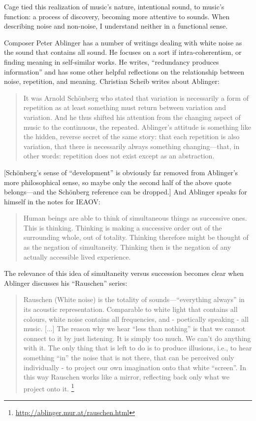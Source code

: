 \documentclass{thesis}
\begin{document}
	Cage tied this realization of music's nature, intentional sound, to music's function: a process of discovery, becoming more attentive to sounds. When describing noise and non-noise, I understand neither in a functional sense.
		
	Composer Peter Ablinger has a number of writings dealing with white noise as the sound that contains all sound. He focuses on a sort if intra-coherentism, or finding meaning in self-similar works. He writes, ``redundancy produces information''\cite{christian_scheib_statics_????} and has some other helpful reflections on the relationship between noise, repetition, and meaning. Christian Scheib writes about Ablinger:
	
	\begin{quote}
	It was Arnold Sch\"onberg who stated that variation is necessarily a form of repetition as at least something must return between variation and variation. And he thus shifted his attention from the changing aspect of music to the continuous, the repeated. Ablinger's attitude is something like the hidden, reverse secret of the same story: that each repetition is also variation, that there is necessarily always something changing---that, in other words: repetition does not exist except as an abstraction. 
	\end{quote}
	
	[Sch\"onberg's sense of ``development'' is obviously far removed from Ablinger's more philosophical sense, so maybe only the second half of the above quote belongs---and the Sch\"onberg reference can be dropped.]	And Ablinger speaks for himself in the notes for IEAOV:
	
	\begin{quote}
	Human beings are able to think of simultaneous things as successive ones. This is thinking. Thinking is making a successive order out of the surrounding whole, out of totality. Thinking therefore might be thought of as the negation of simultaneity. Thinking then is the negation of any actually accessible lived experience.
	\end{quote}
	
	The relevance of this idea of simultaneity versus succession becomes clear when Ablinger discusses his ``Rauschen'' series:
	
	\begin{quote}
	Rauschen (White noise) is the totality of sounds---``everything always'' in its acoustic representation. Comparable to white light that contains all colours, white noise contains all frequencies, and - poetically speaking - all music. [...] The reason why we hear ``less than nothing'' is that we cannot connect to it by just listening. It is simply too much. We can't do anything with it. The only thing that is left to do is to produce illusions, i.e., to hear something ``in'' the noise that is not there, that can be perceived only individually - to project our own imagination onto that white ``screen''. In this way Rauschen works like a mirror, reflecting back only what we project onto it. \footnote{\url{http://ablinger.mur.at/rauschen.html}}
	\end{quote}
\end{document}
